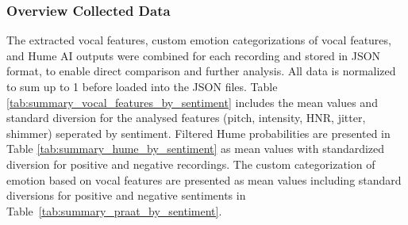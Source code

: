 \subsubsection{Overview Collected Data}
The extracted vocal features, custom emotion categorizations of vocal features, and Hume AI outputs were combined for each recording and stored in JSON format, to enable direct comparison and further analysis. All data is normalized to sum up to 1 before loaded into the JSON files. 
Table \ref{tab:summary_vocal_features_by_sentiment} includes the mean values and standard diversion for the analysed features (pitch, intensity, HNR, jitter, shimmer) seperated by sentiment. 
Filtered Hume probabilities are presented in Table \ref{tab:summary_hume_by_sentiment} as mean values with standardized diversion for positive and negative recordings.
The custom categorization of emotion based on vocal features are presented as mean values including standard diversions for positive and negative sentiments in Table~\ref{tab:summary_praat_by_sentiment}. 

